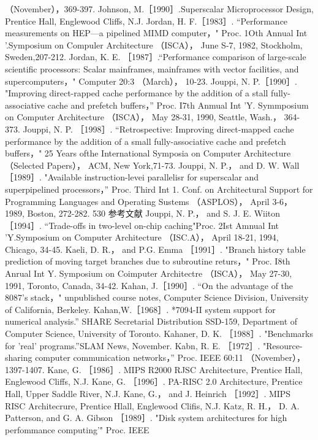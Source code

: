 （November），369-397.
Johnson, M.［1990］.Superscalar Microprocessor Design, Prentice Hall, Englewood Cliffs, N.J.
Jordan, H. F.［1983］. “Performance measurements on HEP—a pipelined MIMD computer，" Proc. 1Oth Annual Int '.Symposium
on Compuler Architecture （ISCA）， June S-7, 1982, Stockholm, Sweden,207-212.
Jordan, K. E. ［1987］.“Performance comparison of large-scale scientific processors: Scalar mainframes, mainframes with vector
facilities, and supercomputers，" Computer 20:3 （March）， 10-23.
Jouppi, N. P.［1990］. "Improving direct-rapped cache performance by the addition of a stall fully-associative cache and prefetch
buffers，” Proc. I7th Anmual Int 'Y. Symmposium on Computer Architecture （ISCA）， May 28-31, 1990, Seattle, Wash.， 364-373.
Jouppi, N. P. ［1998］. “Retrospective: Improving direct-mapped cache performance by the addition of a small fully-associative
cache and prefetch buffers，" 25 Years ofthe International Symposia on Computer Architecture （Selected Papers）， ACM, New
York,71-73.
Jouppi, N. P.， and D. W. Wall ［1989］. "Available instruction-levei parallelisr for superscalar and superpipelined processors，”
Proc. Third Int 1. Conf. on Architectural Support for Programming Languages and Operating Sustems （ASPLOS）， April 3-6，
1989, Boston, 272-282.
530
参考文献
Jouppi, N. P.， and S. J. E. Wiiton ［1994］. “Trade-offs in two-level on-chip caching"Proc. 2Ist Amnual Int 'Y.Symposium on
Computer Architecture （ISC.A）， April 18-21, 1994, Chicago, 34-45.
Kaeli, D. R.， and P.G. Emma ［1991］. "Branch history table prediction of moving target branches due to subroutine returs，" Proc.
I8th Anrual Int Y. Symposium on Coimputer Architectre （ISCA）， May 27-30, 1991, Toronto, Canada, 34-42.
Kahan, J.［1990］. “On the advantage of the 8087's stack，" unpublished course notes, Computer Science Division, University of
California, Berkeley.
Kahan,W.［1968］. *7094-II system support for numerical analysis.” SHARE Secretarial Distribution SSD-159, Department of
Computer Science, University of Toronto.
Kahaner, D. K. ［1988］. "Benchmarks for 'real' programs.”SLAM News, November.
Kabn, R. E. ［1972］. "Resource-sharing computer communication networks，” Proc. IEEE 60:11 （November）， 1397-1407.
Kane, G. ［1986］. MIPS R2000 RJSC Architecture, Prentice Hall, Englewood Cliffs, N.J.
Kane, G. ［1996］. PA-RISC 2.0 Architecture, Prentice Hall, Upper Saddle River, N.J.
Kane, G.， and J. Heinrich ［1992］. MIPS RISC Architecrure, Prentice Hlall, Englewood Clifis, N.J.
Katz, R. H.， D. A. Patterson, and G. A. Gibson ［1989］. "Disk system architectures for high perfommance computing'" Proc. IEEE
